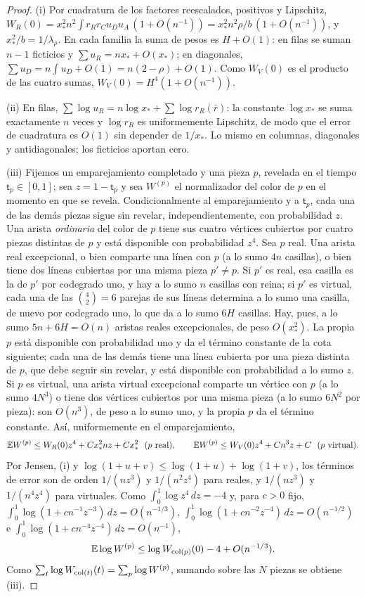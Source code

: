 \begin{proof}
(i) Por cuadratura de los factores reescalados, positivos y Lipschitz,
$W_R(0)=x_*^2n^2\int r_Rr_Cu_Du_A\,(1+O(n^{-1}))=x_*^2n^2\rho/b\,(1+O(n^{-1}))$, y
$x_*^2/b=1/\lambda_\rho$. En cada familia la suma de pesos es $H+O(1)$: en filas se suman
$n-1$ ficticios y $\sum u_R=nx_*+O(x_*)$; en diagonales, $\sum u_D=n\int u_D+O(1)=n(2-\rho)+O(1)$.
Como $W_V(0)$ es el producto de las cuatro sumas, $W_V(0)=H^4(1+O(n^{-1}))$.

(ii) En filas, $\sum\log u_R=n\log x_*+\sum\log r_R(\bar r)$: la constante $\log x_*$ se suma
exactamente $n$ veces y $\log r_R$ es uniformemente Lipschitz, de modo que el error de
cuadratura es $O(1)$ sin depender de $1/x_*$. Lo mismo en columnas, diagonales y
antidiagonales; los ficticios aportan cero.

(iii) Fijemos un emparejamiento completado y una pieza $p$, revelada en el tiempo
$\mathsf t_p\in[0,1]$; sea $z=1-\mathsf t_p$ y sea $W^{(p)}$ el normalizador del color de $p$ en el
momento en que se revela. Condicionalmente al emparejamiento y a $\mathsf t_p$, cada una de las
demás piezas sigue sin revelar, independientemente, con probabilidad $z$. Una arista
\emph{ordinaria} del color de $p$ tiene sus cuatro vértices cubiertos por cuatro piezas distintas
de $p$ y está disponible con probabilidad $z^4$. Sea $p$ real. Una arista real excepcional, o
bien comparte una línea con $p$ (a lo sumo $4n$ casillas), o bien tiene dos líneas cubiertas por
una misma pieza $p'\ne p$. Si $p'$ es real, esa casilla es la de $p'$ por codegrado uno, y hay a
lo sumo $n$ casillas con reina; si $p'$ es virtual, cada una de las $\binom42=6$ parejas de sus
líneas determina a lo sumo una casilla, de nuevo por codegrado uno, lo que da a lo sumo $6H$
casillas. Hay, pues, a lo sumo $5n+6H=O(n)$ aristas reales excepcionales, de peso $O(x_*^2)$. La
propia $p$ está disponible con probabilidad uno y da el término constante de la cota siguiente;
cada una de las demás tiene una línea cubierta por una pieza distinta de $p$, que debe seguir sin
revelar, y está disponible con probabilidad a lo sumo $z$. Si $p$ es virtual, una arista virtual
excepcional comparte un vértice con $p$ (a lo sumo $4N^3$) o tiene dos vértices cubiertos por una
misma pieza (a lo sumo $6N^2$ por pieza): son $O(n^3)$, de peso a lo sumo uno, y la propia $p$ da
el término constante. Así, uniformemente en el emparejamiento,
\[
 \E W^{(p)}\le W_R(0)z^4+Cx_*^2nz+Cx_*^2\ \ (p\text{ real}),\qquad
 \E W^{(p)}\le W_V(0)z^4+Cn^3z+C\ \ (p\text{ virtual}).
\]
Por Jensen, (i) y $\log(1+u+v)\le\log(1+u)+\log(1+v)$, los términos de error son de orden
$1/(nz^3)$ y $1/(n^2z^4)$ para reales, y $1/(nz^3)$ y $1/(n^4z^4)$ para virtuales. Como
$\int_0^1\log z^4\,dz=-4$ y, para $c>0$ fijo, $\int_0^1\log(1+cn^{-1}z^{-3})\,dz=O(n^{-1/3})$,
$\int_0^1\log(1+cn^{-2}z^{-4})\,dz=O(n^{-1/2})$ e $\int_0^1\log(1+cn^{-4}z^{-4})\,dz=O(n^{-1})$,
\[
 \mathbb{E}\log W^{(p)}\le\log W_{\mathrm{col}(p)}(0)-4+O(n^{-1/3}).
\]
Como $\sum_t\log W_{\mathrm{col}(t)}(t)=\sum_p\log W^{(p)}$, sumando sobre las $N$ piezas se obtiene
(iii).
\end{proof}

